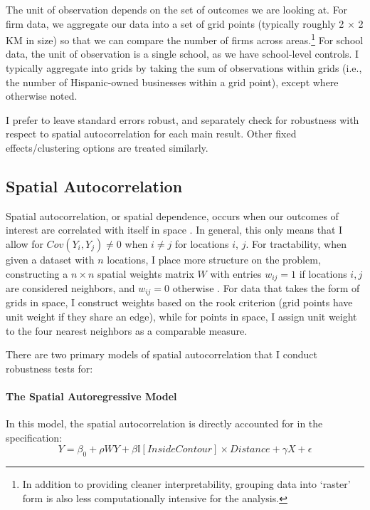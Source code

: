 \documentclass[11pt]{article}
\begin{document}
The unit of observation depends on the set of outcomes we are looking at. For firm data, we aggregate our data into a set of grid points (typically roughly 2 $\times$ 2 KM in size) so that we can compare the number of firms across areas.\footnote{ In addition to providing cleaner interpretability, grouping data into `raster' form is also less computationally intensive for the analysis.} For school data, the unit of observation is a single school, as we have school-level controls. I typically aggregate into grids by taking the sum of observations within grids (i.e., the number of Hispanic-owned businesses within a grid point), except where otherwise noted.

I prefer to leave standard errors robust, and separately check for robustness with respect to spatial autocorrelation for each main result. Other fixed effects/clustering options are treated similarly.

\subsection{Spatial Autocorrelation}

Spatial autocorrelation, or spatial dependence, occurs when our outcomes of interest are correlated with itself in space \citep{cliff_spatial_1973}. In general, this only means that I allow for $Cov(Y_i,Y_j) \neq 0$ when $i\neq j$ for locations $i$, $j$. For tractability, when given a dataset with $n$ locations, I place more structure on the problem, constructing a $n \times n$ spatial weights matrix $W$ with entries $w_{ij} = 1$ if locations $i,j$ are considered neighbors, and $w_{ij} = 0$ otherwise \citep{anselin_spatial_1998}. For data that takes the form of grids in space, I construct weights based on the rook criterion (grid points have unit weight if they share an edge), while for points in space, I assign unit weight to the four nearest neighbors as a comparable measure.

There are two primary models of spatial autocorrelation that I conduct robustness tests for:

\paragraph{The Spatial Autoregressive Model}

In this model, the spatial autocorrelation is directly accounted for in the specification:
\[ Y = \beta_0 + \rho W Y + \beta \mathbb{I}[InsideContour] \times Distance + \gamma X + \epsilon \]
\end{document}
